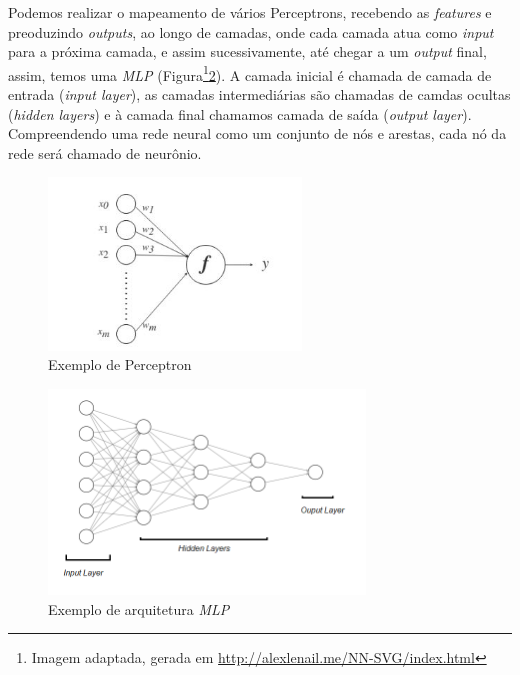 Podemos realizar o mapeamento de vários Perceptrons, recebendo as \textit{features} e preoduzindo \textit{outputs}, ao longo de camadas, onde cada camada atua como \textit{input} para a próxima camada, e assim sucessivamente, até chegar a um \textit{output} final, assim, temos uma \textit{MLP} (Figura\footnote{Imagem adaptada, gerada em \url{http://alexlenail.me/NN-SVG/index.html}}\ref{fig:mlp}). A camada inicial é chamada de camada de entrada (\textit{input layer}), as camadas intermediárias são chamadas de camdas ocultas (\textit{hidden layers}) e à camada final chamamos camada de saída (\textit{output layer}). Compreendendo uma rede neural como um conjunto de nós e arestas, cada nó da rede será chamado de neurônio.

\begin{figure}[!ht]
\centering
\includegraphics[width=0.6\textwidth]{imagens/perceptron.png}
\caption{\label{fig:perceptron}Exemplo de Perceptron}

\author{Fonte: Retirado de \cite{12}}
\end{figure}

\begin{figure}[!h]
\centering
\includegraphics[width=0.75\textwidth]{imagens/mlp02.png}
\caption{\label{fig:mlp}Exemplo de arquitetura \textit{MLP}}

\end{figure}


